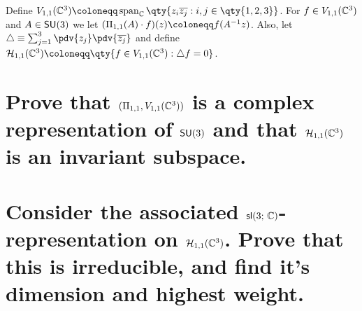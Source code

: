\documentclass[
	pages,
	boxes,
	color=WildStrawberry
]{homework}
\theoremstyle{plain}
\begin{document}
\begin{solution}

\end{solution}

\begin{problem}
Define $V_{1, 1}(\C^3)\defeq \vspan_\C\qty{z_i\overline{z_j} : i, j\in\qty{1,2,3}}$. For $f\in V_{1,1}(\mathbb{C}^3)$ and $A\in \mathsf{SU}(3)$ we let $(\Pi_{1,1}(A)\cdot f)(z)\defeq f(A^{-1}z)$. Also, let $\laplace \equiv \sum_{j = 1}^3 \pdv{z_j}\pdv{\overline{z_j}}$ and define $\mathcal{H}_{1,1}(\C^3)\defeq \qty{f\in V_{1, 1}(\C^3) : \laplace{f} = 0}$.
\begin{parts}
	\part{Prove that $(\Pi_{1,1}, V_{1,1}(\mathbb{C}^3))$ is a complex representation of $\mathsf{SU}(3)$ and that $\mathcal{H}_{1,1}(\mathbb{C}^3)$ is an invariant subspace.}\label{part:4a}
	\part{Consider the associated $\mathsf{sl}(3;\, \mathbb{C})$-representation on $\mathcal{H}_{1,1}(\mathbb{C}^3)$. Prove that this is irreducible, and find it's dimension and highest weight.}\label{part:4b}
\end{parts}
\end{problem}
\end{document}
